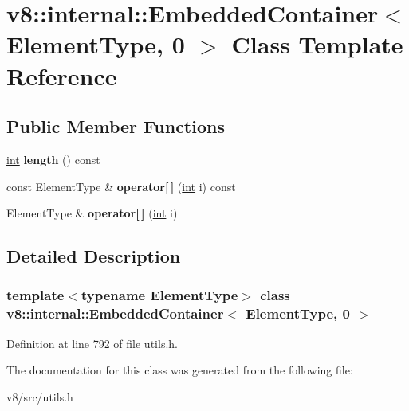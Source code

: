 \hypertarget{classv8_1_1internal_1_1EmbeddedContainer_3_01ElementType_00_010_01_4}{}\section{v8\+:\+:internal\+:\+:Embedded\+Container$<$ Element\+Type, 0 $>$ Class Template Reference}
\label{classv8_1_1internal_1_1EmbeddedContainer_3_01ElementType_00_010_01_4}
\subsection*{Public Member Functions}
\begin{DoxyCompactItemize}
\item 
\mbox{\label{classv8_1_1internal_1_1EmbeddedContainer_3_01ElementType_00_010_01_4_a78131bf13ed167c758ad8859af0803b4}} 
\mbox{\hyperlink{classint}{int}} {\bfseries length} () const
\item 
\mbox{\label{classv8_1_1internal_1_1EmbeddedContainer_3_01ElementType_00_010_01_4_a34bb84898c4f1975008d25ffbbdb4e98}} 
const Element\+Type \& {\bfseries operator\mbox{[}$\,$\mbox{]}} (\mbox{\hyperlink{classint}{int}} i) const
\item 
\mbox{\label{classv8_1_1internal_1_1EmbeddedContainer_3_01ElementType_00_010_01_4_a2e68b4ec3f24b76990d72948a30e110f}} 
Element\+Type \& {\bfseries operator\mbox{[}$\,$\mbox{]}} (\mbox{\hyperlink{classint}{int}} i)
\end{DoxyCompactItemize}


\subsection{Detailed Description}
\subsubsection*{template$<$typename Element\+Type$>$\newline
class v8\+::internal\+::\+Embedded\+Container$<$ Element\+Type, 0 $>$}



Definition at line 792 of file utils.\+h.



The documentation for this class was generated from the following file\+:\begin{DoxyCompactItemize}
\item 
v8/src/utils.\+h\end{DoxyCompactItemize}
